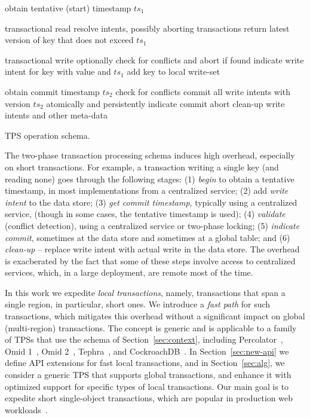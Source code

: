 \begin{algorithm}[tb]
\begin{algorithmic}[1]
\State obtain tentative (start) timestamp $ts_1$ 
\EndProcedure
\Statex

 \Comment transactional read
	\State resolve intents, possibly  aborting transactions \label{l:resolve}
\EndIf
\State return latest version of key that does not exceed $ts_1$
\EndProcedure
\Statex

 \Comment transactional write
\State optionally check for conflicts and abort if found 
\State indicate write intent for key with value and $ts_1$
\State add key to local write-set
\EndProcedure
\Statex

\State obtain commit timestamp $ts_2$
  \Comment check for conflicts  \label{l:validate}
	\Statex \Comment commit all write intents with version $ts_2$
	\State atomically and persistently indicate commit   \label{l:commit}
\Else
	\State abort	
\EndIf
\State clean-up write intents and other meta-data
\EndProcedure
\end{algorithmic}
\caption{TPS operation schema.} 
\label{alg:schema}
\end{algorithm} 

The two-phase transaction processing schema induces high overhead, especially on short transactions. For example, a transaction writing a single key (and reading none) goes through the following stages:  
(1) \emph{begin} to obtain a tentative timestamp, in most implementations from a centralized service;  
(2) add \emph{write intent} to the data store; 
(3) \emph{get commit timestamp}, typically using a centralized service, (though in some cases, the tentative timestamp is used);
(4) \emph{validate} (conflict detection), using a centralized service or two-phase locking; 
(5) \emph{indicate commit}, sometimes at the data store and sometimes at a global table; and 
(6) \emph{clean-up} -- replace write intent with actual write in the data store. 
The overhead is exacberated by 
the fact that some of these steps involve access to centralized services, which, in a large deployment, are remote most of the time.

In this work we expedite   \emph{local transactions}, namely,  transactions that span a single region, in particular, short ones. We
introduce a \emph{fast path} for such transactions, which mitigates this overhead
without a significant impact on global (multi-region) transactions.
The concept is generic and is applicable to a family of TPSs that use the schema of Section~\ref{sec:context}, 
including Percolator~\cite{Percolator2010}, Omid 1~\cite{OmidICDE2014}, Omid 2~\cite{omid-blog}, Tephra~\cite{tephra}, 
and CockroachDB~\cite{cockroach}. 
In Section~\ref{sec:new-api} we define API extensions for fast local transactions, 
and in Section~\ref{sec:alg}, we consider  a generic TPS that supports global transactions, 
and enhance it with optimized support for specific types of local transactions. 
Our main goal is to expedite short single-object  transactions,
which are popular in production web workloads~\cite{omid-blog}.

